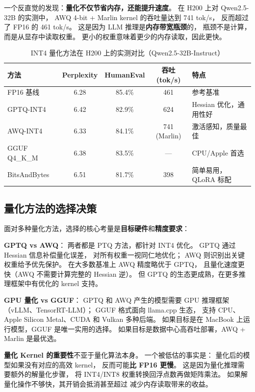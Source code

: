 一个反直觉的发现：\textbf{量化不仅节省内存，还能提升速度}。
在 H200 上对 Qwen2.5-32B 的实测中，
AWQ 4-bit + Marlin kernel 的吞吐量达到 741 tok/s，
反而超过了 FP16 的 461 tok/s。
这是因为 LLM 推理是\textbf{内存带宽瓶颈}的，
瓶颈不是计算，而是从显存中读取权重。
更小的权重意味着更少的内存读取，因此更快。

\begin{table}[H]
\centering\small
\renewcommand{\arraystretch}{1.3}
\caption{INT4 量化方法在 H200 上的实测对比（Qwen2.5-32B-Instruct）}\label{tab:quant-comparison}
\begin{tabularx}{\linewidth}{l c c c X}
\toprule
\rowcolor{figLightGray}
\textbf{方法} & \textbf{Perplexity} & \textbf{HumanEval} & \textbf{吞吐 (tok/s)} & \textbf{特点} \\
\midrule
FP16 基线 & 6.28 & 85.4\% & 461 & 参考基准 \\
GPTQ-INT4 & 6.42 & 82.9\% & 624 & Hessian 优化，通用性好 \\
AWQ-INT4 & 6.33 & 84.1\% & 741 (Marlin) & 激活感知，质量最佳 \\
GGUF Q4\_K\_M & 6.38 & 83.5\% & --- & CPU/Apple 首选 \\
BitsAndBytes & 6.51 & 81.7\% & 398 & 简单易用，QLoRA 标配 \\
\bottomrule
\end{tabularx}
\end{table}

\subsection{量化方法的选择决策}

面对多种量化方法，选择的核心考量是\textbf{目标硬件}和\textbf{精度要求}：

\textbf{GPTQ vs AWQ}：
两者都是 PTQ 方法，都针对 INT4 优化。
GPTQ 通过 Hessian 信息补偿量化误差，
对所有权重一视同仁地优化；
AWQ 则识别出关键权重给予优先保护。
在大多数基准上 AWQ 精度略优于 GPTQ，
且量化速度更快（AWQ 不需要计算完整的 Hessian 逆）。
但 GPTQ 的生态更成熟，在更多推理框架中有优化的 kernel 支持。

\textbf{GPU 量化 vs GGUF}：
GPTQ 和 AWQ 产生的模型需要 GPU 推理框架（vLLM、TensorRT-LLM）；
GGUF 格式面向 llama.cpp 生态，
支持 CPU、Apple Silicon Metal、CUDA 和 Vulkan 多种后端。
如果目标是在 MacBook 上运行模型，GGUF 是唯一实用的选择。
如果目标是数据中心高吞吐部署，AWQ + Marlin 是最优选。

\textbf{量化 Kernel 的重要性}不亚于量化算法本身。
一个被低估的事实是：
量化后的模型如果没有对应的高效 kernel，
反而可能\textbf{比 FP16 更慢}。
这是因为量化推理需要额外的解量化步骤，
将 INT4/INT8 权重转换回浮点数再做矩阵乘法。
如果解量化操作不够快，其开销会抵消甚至超过
减少内存读取带来的收益。

